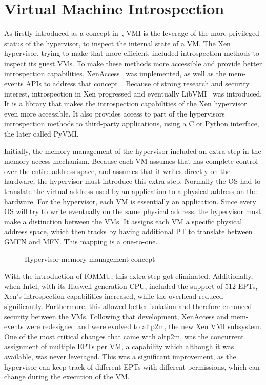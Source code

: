 \section{Virtual Machine Introspection}\label{sec:vmi}
As firstly introduced as a concept in~\cite{garfinkel2003virtual}, \ac{VMI} is the leverage of the more privileged status of the hypervisor, to inspect the internal state of a \ac{VM}. The Xen hypervisor, trying to make that more efficient, included introspection methods to inspect its guest \ac{VM}s. To make these methods more accessible and provide better introspection capabilities, XenAccess~\cite{payne2007secure} was implemented, as well as the mem-events \ac{API}s to address that concept~\cite{lars_2016}. Because of strong research and security interest, introspection in Xen progressed and eventually LibVMI~\cite{payne2011libvmi} was introduced. It is a library that makes the introspection capabilities of the Xen hypervisor even more accessible. It also provides access to part of the hypervisors introspection methods to third-party applications, using a C or Python interface, the later called PyVMI.

\par Initially, the memory management of the hypervisor included an extra step in the memory access mechanism. Because each \ac{VM} assumes that has complete control over the entire address space, and assumes that it writes directly on the hardware, the hypervisor must introduce this extra step. Normally the \ac{OS} had to translate the virtual address used by an application to a physical address on the hardware. For the hypervisor, each \ac{VM} is essentially an application. Since every \ac{OS} will try to write eventually on the same physical address, the hypervisor must make a distinction between the \ac{VM}s. It assigns each \ac{VM} a specific physical address space, which then tracks by having additional \ac{PT} to translate between \ac{GMFN} and \ac{MFN}. This mapping is a one-to-one.

\begin{figure}
	\centering
	
	\caption{Hypervisor memory management concept}
	\label{fig:hypmm}
\end{figure}

\par With the introduction of \ac{IOMMU}, this extra step got eliminated. Additionally, when Intel, with its Haswell generation \ac{CPU}, included the support of 512 \ac{EPT}s, Xen’s introspection capabilities increased, while the overhead reduced significantly. Furthermore, this allowed better isolation and therefore enhanced security between the \ac{VM}s. Following that development, XenAccess and mem-events were redesigned and were evolved to altp2m, the new Xen \ac{VMI} subsystem. One of the most critical changes that came with altp2m, was the concurrent assignment of multiple \ac{EPT}s per \ac{VM}, a capability which although it was available, was never leveraged. This was a significant improvement, as the hypervisor can keep track of different \ac{EPT}s with different permissions, which can change during the execution of the \ac{VM}.

